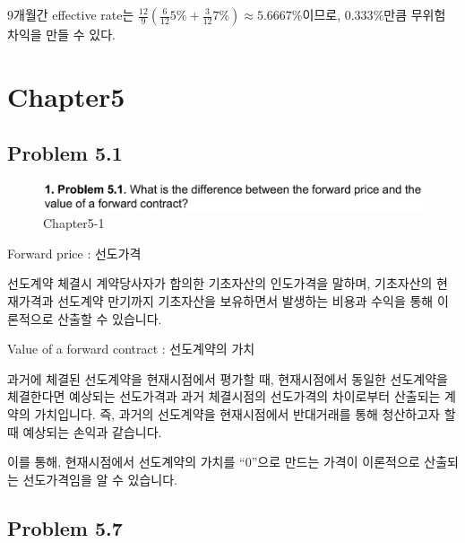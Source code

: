 \documentclass[
  letterpaper,
  DIV=11,
  numbers=noendperiod]{scrreprt}
\begin{document}
9개월간 effective rate는
\(\frac{12}{9}(\frac{6}{12}5\%+\frac{3}{12}7\%)\approx 5.6667\%\)이므로,
\(0.333\%\)만큼 무위험 차익을 만들 수 있다.

\section*{Chapter5}\label{chapter5}


\subsection*{\texorpdfstring{\textbf{Problem
5.1}}{Problem 5.1}}\label{problem-5.1}

\begin{figure}[H]

{\centering \includegraphics{images/선물옵션_5-1.png}

}

\caption{Chapter5-1}

\end{figure}%

Forward price : 선도가격

선도계약 체결시 계약당사자가 합의한 기초자산의 인도가격을 말하며,
기초자산의 현재가격과 선도계약 만기까지 기초자산을 보유하면서 발생하는
비용과 수익을 통해 이론적으로 산출할 수 있습니다.

Value of a forward contract : 선도계약의 가치

과거에 체결된 선도계약을 현재시점에서 평가할 때, 현재시점에서 동일한
선도계약을 체결한다면 예상되는 선도가격과 과거 체결시점의 선도가격의
차이로부터 산출되는 계약의 가치입니다. 즉, 과거의 선도계약을
현재시점에서 반대거래를 통해 청산하고자 할 때 예상되는 손익과 같습니다.

이를 통해, 현재시점에서 선도계약의 가치를 ``0''으로 만드는 가격이
이론적으로 산출되는 선도가격임을 알 수 있습니다.

\subsection*{\texorpdfstring{\textbf{Problem
5.7}}{Problem 5.7}}\label{problem-5.7}
\end{document}
